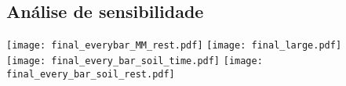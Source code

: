 \subsection{Análise de sensibilidade}
\begin{frame}
  \texttt{[image: final\_everybar\_MM\_rest.pdf]}
  \texttt{[image: final\_large.pdf]}\\[.5cm]
  \texttt{[image: final\_every\_bar\_soil\_time.pdf]}
  \texttt{[image: final\_every\_bar\_soil\_rest.pdf]}


\end{frame}
